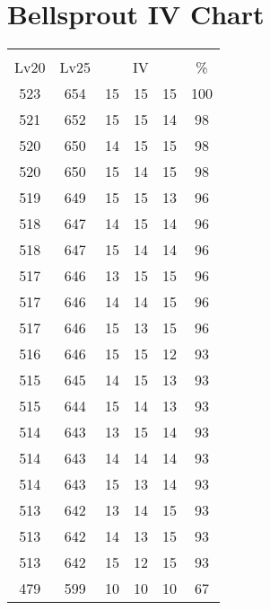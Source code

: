 \documentclass{article}%
\begin{document}
%
\normalsize%
\section{Bellsprout IV Chart}%
\label{sec:Bellsprout IV Chart}%
\renewcommand{\arraystretch}{1.5}%
\begin{tabular}{|c|c|c|c|c|c|}%
\hline%
\multicolumn{6}{|c|}{\textcolor{white}{ 
\linebreak{Bellsprout}
}%
\cellcolor{black}}\\%
\multicolumn{1}{|c}{Lv20}&\multicolumn{1}{c|}{Lv25}&\multicolumn{3}{c|}{IV}&\multicolumn{1}{|c|}{\%}\\%
\hline%
\rowcolor{color100}%
523&654&15&15&15&100\\%
\hline%
\rowcolor{color98}%
521&652&15&15&14&98\\%
\hline%
\rowcolor{color98}%
520&650&14&15&15&98\\%
\hline%
\rowcolor{color98}%
520&650&15&14&15&98\\%
\hline%
\rowcolor{color96}%
519&649&15&15&13&96\\%
\hline%
\rowcolor{color96}%
518&647&14&15&14&96\\%
\hline%
\rowcolor{color96}%
518&647&15&14&14&96\\%
\hline%
\rowcolor{color96}%
517&646&13&15&15&96\\%
\hline%
\rowcolor{color96}%
517&646&14&14&15&96\\%
\hline%
\rowcolor{color96}%
517&646&15&13&15&96\\%
\hline%
\rowcolor{color93}%
516&646&15&15&12&93\\%
\hline%
\rowcolor{color93}%
515&645&14&15&13&93\\%
\hline%
\rowcolor{color93}%
515&644&15&14&13&93\\%
\hline%
\rowcolor{color93}%
514&643&13&15&14&93\\%
\hline%
\rowcolor{color93}%
514&643&14&14&14&93\\%
\hline%
\rowcolor{color93}%
514&643&15&13&14&93\\%
\hline%
\rowcolor{color93}%
513&642&13&14&15&93\\%
\hline%
\rowcolor{color93}%
513&642&14&13&15&93\\%
\hline%
\rowcolor{color93}%
513&642&15&12&15&93\\%
\hline%
\rowcolor{color91}%
479&599&10&10&10&67\\%
\end{tabular}

%
\end{document}
